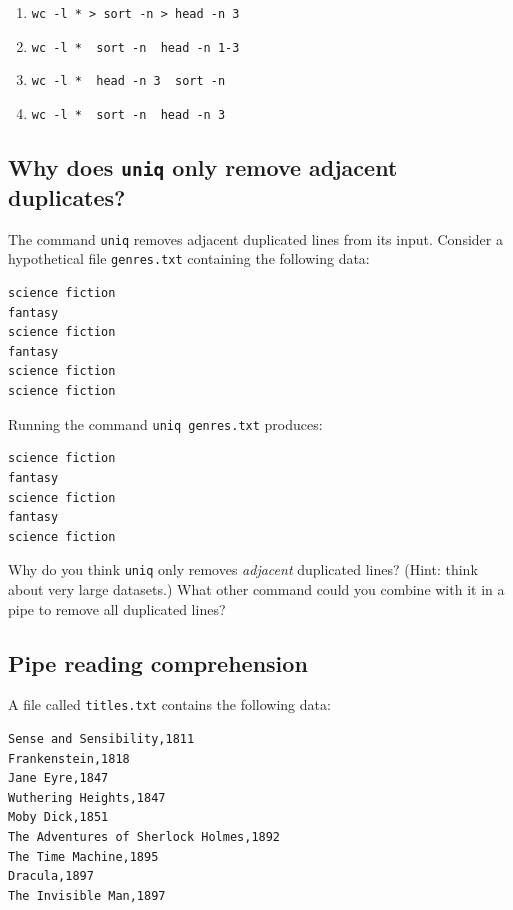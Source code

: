 \documentclass[
]{krantz}
\providecommand{\tightlist}{%
  \setlength{\itemsep}{0pt}\setlength{\parskip}{0pt}}
\begin{document}
\begin{enumerate}
\def\labelenumi{\arabic{enumi}.}
\tightlist
\item
  \texttt{wc\ -l\ *\ \textgreater{}\ sort\ -n\ \textgreater{}\ head\ -n\ 3}
\item
  \texttt{wc\ -l\ *\ \textbar{}\ sort\ -n\ \textbar{}\ head\ -n\ 1-3}
\item
  \texttt{wc\ -l\ *\ \textbar{}\ head\ -n\ 3\ \textbar{}\ sort\ -n}
\item
  \texttt{wc\ -l\ *\ \textbar{}\ sort\ -n\ \textbar{}\ head\ -n\ 3}
\end{enumerate}

\hypertarget{bash-basics-ex-uniq-adjacent}{%
\subsection{\texorpdfstring{Why does \texttt{uniq} only remove adjacent duplicates?}{Why does uniq only remove adjacent duplicates?}}\label{bash-basics-ex-uniq-adjacent}}

The command \texttt{uniq} removes adjacent duplicated lines from its input.
Consider a hypothetical file \texttt{genres.txt} containing the following data:

\begin{verbatim}
science fiction
fantasy
science fiction
fantasy
science fiction
science fiction
\end{verbatim}

Running the command \texttt{uniq\ genres.txt} produces:

\begin{verbatim}
science fiction
fantasy
science fiction
fantasy
science fiction
\end{verbatim}

Why do you think \texttt{uniq} only removes \emph{adjacent} duplicated lines?
(Hint: think about very large datasets.) What other command could
you combine with it in a pipe to remove all duplicated lines?

\hypertarget{bash-basics-ex-reading-pipes}{%
\subsection{Pipe reading comprehension}\label{bash-basics-ex-reading-pipes}}

A file called \texttt{titles.txt} contains the following data:

\begin{verbatim}
Sense and Sensibility,1811
Frankenstein,1818
Jane Eyre,1847
Wuthering Heights,1847
Moby Dick,1851
The Adventures of Sherlock Holmes,1892
The Time Machine,1895
Dracula,1897
The Invisible Man,1897
\end{verbatim}
\end{document}
